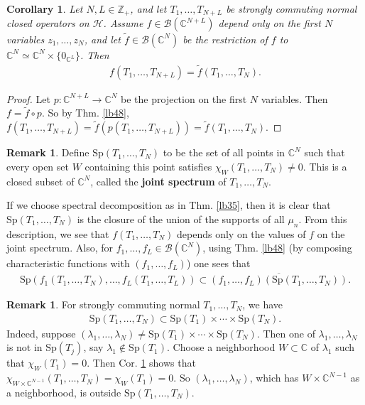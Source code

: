 \documentclass[12pt,a4paper,notitlepage]{article}
\theoremstyle{definition}
\newtheorem{rem}[df]{Remark}
\theoremstyle{plain}
\newtheorem{co}[df]{Corollary}
\newcommand{\mc}{\mathcal}
\newcommand{\wtd}{\widetilde}
\newcommand{\ovl}{\overline}
\newcommand{\scr}{\mathscr}
\newcommand{\Cbb}{\mathbb C}
\newcommand{\Zbb}{\mathbb Z}
\newcommand{\Sp}{\mathrm{Sp}}
\numberwithin{equation}{section}
\begin{document}
\begin{co}\label{lb62}
Let  $N,L\in\Zbb_+$, and let $T_1,\dots,T_{N+L}$ be strongly commuting normal closed operators on $\mc H$.  Assume $f\in\scr B(\Cbb^{N+L})$ depend only on the first $N$ variables $z_1,\dots,z_N$, and let $\wtd f\in\scr B(\Cbb^N)$ be the restriction of $f$ to $\Cbb^N\simeq \Cbb^N\times\{0_{\Cbb^L}\}$. Then
\begin{align*}
f(T_1,\dots,T_{N+L})=\wtd f(T_1,\dots,T_N).	
\end{align*}
\end{co}

\begin{proof}
Let $p:\Cbb^{N+L}\rightarrow\Cbb^N$ be the projection on the first $N$ variables. Then $f=\wtd f\circ p$. So by Thm. \ref{lb48}, $f(T_1,\dots,T_{N+L})=\wtd f(p(T_1,\dots,T_{N+L}))=\wtd f(T_1,\dots,T_N)$.
\end{proof}


\begin{rem}
Define $\Sp(T_1,\dots,T_N)$ \index{Sp@$\Sp(T_1,\dots,T_N)$} to be the set of all points in $\Cbb^N$ such that every open set $W$ containing this point satisfies $\chi_W(T_1,\dots,T_N)\neq 0$. This is a closed subset of $\Cbb^N$, called the \textbf{joint spectrum} of $T_1,\dots,T_N$. 

If we choose spectral decomposition as in Thm. \ref{lb35}, then it is clear that $\Sp(T_1,\dots,T_N)$ is the closure of the union of the supports of all $\mu_n$. From this description, we see that $f(T_1,\dots,T_N)$ depends only on the values of $f$ on the joint spectrum. Also, for $f_1,\dots,f_L\in\scr B(\Cbb^N)$,  using Thm. \ref{lb48} (by composing characteristic functions with $(f_1,\dots,f_L)$) one sees that
\begin{align}
\Sp(f_1(T_1,\dots,T_N),\dots,f_L(T_1,\dots,T_L))\subset\ovl{(f_1,\dots,f_L)(\Sp(T_1,\dots,T_N))}.
\end{align}
\end{rem}



\begin{rem}
For strongly commuting normal $T_1,\dots,T_N$, we have
\begin{align}
\Sp(T_1,\dots,T_N)\subset\Sp(T_1)\times\cdots\times\Sp(T_N).	
\end{align}
Indeed, suppose $(\lambda_1,\dots,\lambda_N)\neq \Sp(T_1)\times\cdots\times\Sp(T_N)$. Then one of $\lambda_1,\dots,\lambda_N$ is not in $\Sp(T_j)$, say $\lambda_1\notin\Sp(T_1)$. Choose a neighborhood $W\subset\Cbb$ of $\lambda_1$ such that $\chi_W(T_1)=0$. Then Cor. \ref{lb62} shows that $\chi_{W\times\Cbb^{N-1}}(T_1,\dots,T_N)=\chi_W(T_1)=0$. So $(\lambda_1,\dots,\lambda_N)$, which has $W\times\Cbb^{N-1}$ as a neighborhood, is outside $\Sp(T_1,\dots,T_N)$.
\end{rem}
\end{document}
